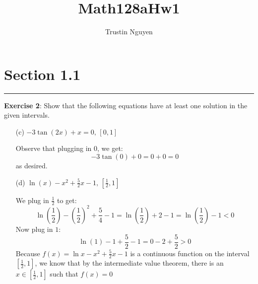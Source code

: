 \documentclass{article}
\title{Math128aHw1}
\author{Trustin Nguyen}
\begin{document}
    \maketitle

\section*{Section 1.1}
\hrule
\textbf{Exercise 2}:
    Show that the following equations have at least one solution in the given intervals.
    \begin{itemize}
        \item [(c)] $-3\tan(2x) + x = 0, \, [0, 1]$
            \begin{answer}
               Observe that plugging in $0$, we get:
                    \begin{equation*}
                        -3\tan(0) + 0 = 0 + 0 = 0
                    \end{equation*}
                as desired.
            \end{answer}

        \item [(d)] $\ln(x) - x^{2} + \frac{5}{2}x - 1, \, [\frac{1}{2}, 1]$
            \begin{answer}
                We plug in $\frac{1}{2}$ to get:
                    \begin{equation*}
                        \ln(\frac{1}{2}) - \left(\frac{1}{2}\right)^2 + \frac{5}{4} - 1 = \ln(\frac{1}{2}) + 2 - 1 = \ln(\frac{1}{2}) - 1 < 0
                    \end{equation*}
                Now plug in $1$:
                    \begin{equation*}
                        \ln(1) - 1 + \frac{5}{2} - 1 = 0 - 2 + \frac{5}{2} > 0
                    \end{equation*}
                Because $f(x) = \ln{x} - x^2 + \frac{5}{2}x - 1$ is a continuous function on the interval $[\frac{1}{2}, 1]$, we know that by the intermediate value theorem, there is an $x \in [\frac{1}{2}, 1]$ such that $f(x) = 0$
            \end{answer}
    \end{itemize}
\end{document}
